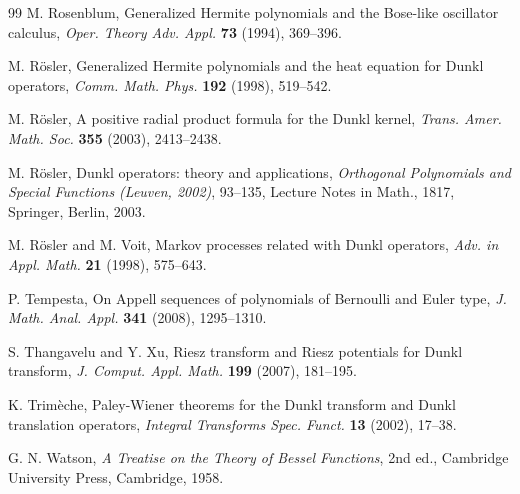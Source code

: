\documentclass[11pt]{article}
\theoremstyle{plain}
\theoremstyle{remark}
\numberwithin{equation}{section} %
\begin{document}
\begin{thebibliography}{99}
M. Rosenblum,
{Generalized Hermite polynomials and the Bose-like oscillator calculus},
\textit{Oper. Theory Adv. Appl.}
\textbf{73} (1994), 369--396.

M. R\"osler,
Generalized Hermite polynomials and the heat equation for Dunkl operators, 
\textit{Comm. Math. Phys.} \textbf{192} (1998), 519--542.

M. R\"osler,
A positive radial product formula for the Dunkl kernel,
\textit{Trans. Amer. Math. Soc.}
\textbf{355} (2003), 2413--2438.

M. R\"osler,
Dunkl operators: theory and applications,
\textit{Orthogonal Polynomials and Special Functions 
(Leuven, 2002)}, 93--135, 
Lecture Notes in Math., 1817, Springer, Berlin, 2003.

M. R\"osler and M. Voit,
Markov processes related with Dunkl operators, 
\textit{Adv. in Appl. Math.} \textbf{21} (1998), 575--643.

P. Tempesta,
On Appell sequences of polynomials of Bernoulli and Euler type,
\textit{J. Math. Anal. Appl.} 
\textbf{341} (2008), 1295--1310.

S. Thangavelu and Y. Xu,
Riesz transform and Riesz potentials for Dunkl transform,
\textit{J. Comput. Appl. Math.}
\textbf{199} (2007), 181--195.

K. Trim\`eche,
Paley-Wiener theorems for the Dunkl transform and Dunkl translation operators,
\textit{Integral Transforms Spec. Funct.} 
\textbf{13} (2002), 17--38.

G. N. Watson,
\textit{A Treatise on the Theory of Bessel Functions}, 2nd ed.,
Cambridge University Press, Cambridge, 1958.



\end{thebibliography}

\end{document}
